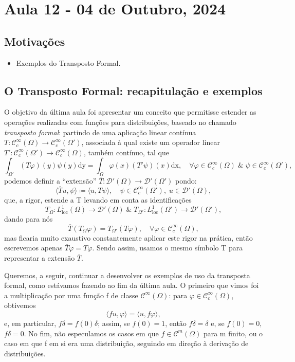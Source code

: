 \documentclass[../distribution_theory_notes.tex]{subfiles}
\begin{document}
\section{Aula 12 - 04 de Outubro, 2024}
\subsection{Motivações}
\begin{itemize}
 \item Exemplos do Transposto Formal.
\end{itemize}
\subsection{O Transposto Formal: recapitulação e exemplos}
O objetivo da última aula foi apresentar um conceito que permitisse estender as operações realizadas com funções para distribuições, baseado no chamado \textit{transposto formal}: partindo de uma 
aplicação linear contínua \(T:\mathcal{C}_{c}^{\infty}(\Omega )\rightarrow \mathcal{C}_{c}^{\infty}(\Omega ')\), associada à qual existe um operador linear \(T':\mathcal{C}_{c}^{\infty}(\Omega' )\rightarrow \mathcal{C}_{c}^{\infty}(\Omega )\), também contínuo, tal que 
  \[
    \int_{\Omega '}^{} (T\varphi )(y)\psi (y) \mathrm{dy} = \int_{\Omega }^{}\varphi (x)(T'\psi )(x) \mathrm{dx},\quad \forall \varphi \in \mathcal{C}_{c}^{\infty}(\Omega )\;\&\; \psi \in \mathcal{C}_{c}^{\infty}(\Omega '),
  \]
  podemos definir a ``extensão'' \(\overline{T}:\mathcal{D}'(\Omega )\rightarrow \mathcal{D}'(\Omega ') \) pondo: 
    \[
      \langle \overline{T}u, \psi  \rangle\coloneqq \langle u, T\psi  \rangle, \quad \psi \in \mathcal{C}_{c}^{\infty}(\Omega '),\; u\in \mathcal{D}'(\Omega ),
    \]
    que, a rigor, estende a T levando em conta as identificações 
      \[
        T_{\Omega }: L_{\mathrm{loc}}^{1}(\Omega )\rightarrow \mathcal{D}'(\Omega) \;\&\; T_{\Omega'}:L_{\mathrm{loc}}^{1}(\Omega')\rightarrow \mathcal{D}'(\Omega '),
      \]
      dando para nós 
        \[
          \overline{T}(T_{\Omega }\varphi )= T_{\Omega'}(T\varphi ),\quad \forall \varphi \in \mathcal{C}_{c}^{\infty}(\Omega ),
        \]
        mas ficaria muito exaustivo constantemente aplicar este rigor na prática, então escrevemos apenas \(\overline{T}\varphi = T\varphi \). Sendo assim, usamos o mesmo símbolo T para representar a extensão \(\overline{T}.\)

        Queremos, a seguir, continuar a desenvolver os exemplos de uso da transposta formal, como estávamos fazendo ao fim da última aula. O primeiro que vimos foi a multiplicação por uma função f de classe \(\mathcal{C}^{\infty}(\Omega )\): para \(\varphi \in \mathcal{C}_{c}^{\infty}(\Omega )\), obtivemos 
          \[
            \langle f u, \varphi  \rangle=\langle u, f \varphi  \rangle,
          \]
          e, em particular, \(f\delta =f(0)\delta \); assim, se \(f(0)=1\), então \(f\delta =\delta \) e, se \(f(0)=0,\) \(f\delta =0.\) No fim, não especulamos os casos em que \(f\in \mathcal{C}^{m}(\Omega )\) para m finito, ou o caso em que f em si era uma distribuição, seguindo em direção à derivação de distribuições.
\end{document}
